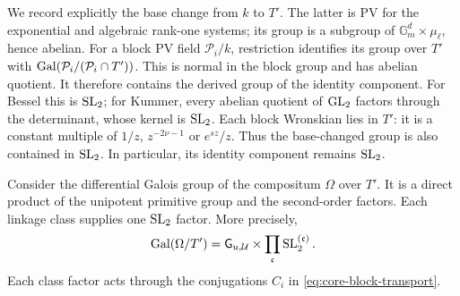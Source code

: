 We record explicitly the base change from $k$ to $T'$.
The latter is PV for the exponential and algebraic rank-one systems;
its group is a subgroup of $\mathbb G_m^d\times\mu_\ell$, hence abelian.
For a block PV field $\mathcal P_i/k$, restriction identifies its group over
$T'$ with $\operatorname{Gal}(\mathcal P_i/(\mathcal P_i\cap T'))$. This is normal in the block group
and has abelian quotient. It therefore contains the derived group of
the identity component. For Bessel this is $\operatorname{SL}_2$; for Kummer,
every abelian quotient of $\operatorname{GL}_2$ factors through the determinant,
whose kernel is $\operatorname{SL}_2$. Each block Wronskian lies in $T'$:
it is a constant multiple of $1/z$, $z^{-2\nu-1}$ or $e^{sz}/z$.
Thus the base-changed group is also contained in $\operatorname{SL}_2$.
In particular, its identity component remains $\operatorname{SL}_2$.
\begin{proposition}\label{prop:product}
Consider the differential Galois group of the compositum $\Omega$ over $T'$.
It is a direct product of the unipotent primitive group and the
second-order factors. Each linkage class supplies one $\operatorname{SL}_2$ factor.
More precisely,
\begin{equation}\label{eq:core-product}
\operatorname{Gal}(\Omega/T')=\mathsf G_{u,\mathcal U}\times\prod_{\mathfrak c}\operatorname{SL}_2^{(\mathfrak c)}.
\end{equation}
Each class factor acts through the conjugations $C_i$ in
\eqref{eq:core-block-transport}.
\end{proposition}
